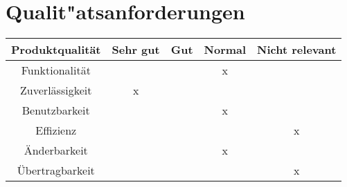\section{Qualit"atsanforderungen}


\begin{tabular}{|c|c|c|c|c|}
	\hline Produktqualität & Sehr gut & Gut & Normal & Nicht relevant \\
	\hline Funktionalität  &          &     &   x    &                \\
	\hline Zuverlässigkeit &    x     &     &        &                \\
	\hline Benutzbarkeit   &          &     &   x    &                \\
	\hline Effizienz       &          &     &        &       x        \\
	\hline Änderbarkeit    &          &     &   x    &                \\
	\hline Übertragbarkeit &          &     &        &       x        \\
	\hline 
\end{tabular}